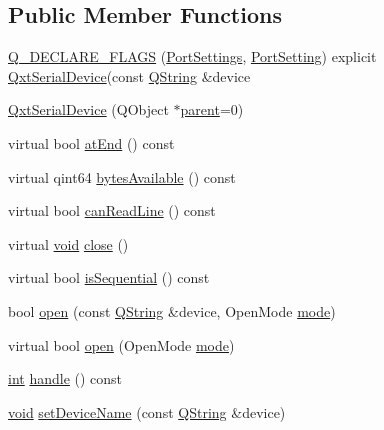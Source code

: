 \subsection*{Public Member Functions}
\begin{DoxyCompactItemize}
\item 
\hyperlink{class_qxt_serial_device_a98d6988c94e947f64b6294d244c6cdd2}{Q\-\_\-\-D\-E\-C\-L\-A\-R\-E\-\_\-\-F\-L\-A\-G\-S} (\hyperlink{struct_port_settings}{Port\-Settings}, \hyperlink{class_qxt_serial_device_aefe4c3cf41454d4595db50e03c4103da}{Port\-Setting}) explicit \hyperlink{class_qxt_serial_device}{Qxt\-Serial\-Device}(const \hyperlink{group___u_a_v_objects_plugin_gab9d252f49c333c94a72f97ce3105a32d}{Q\-String} \&device
\item 
\hyperlink{class_qxt_serial_device_adba1a3d0b96c4d390de8010239dcc214}{Qxt\-Serial\-Device} (Q\-Object $\ast$\hyperlink{class_qxt_serial_device_a0323aeafb6ee88ae1e3d2425972de5d1}{parent}=0)
\item 
virtual bool \hyperlink{class_qxt_serial_device_aae6e2093f74fb2771270fb48b090cdb2}{at\-End} () const 
\item 
virtual qint64 \hyperlink{class_qxt_serial_device_a15ceea004a7385796075a08d0f7d76b0}{bytes\-Available} () const 
\item 
virtual bool \hyperlink{class_qxt_serial_device_a0dc579e3c5b8890b9becfbc983241b57}{can\-Read\-Line} () const 
\item 
virtual \hyperlink{group___u_a_v_objects_plugin_ga444cf2ff3f0ecbe028adce838d373f5c}{void} \hyperlink{class_qxt_serial_device_a853d822d8c2877df6470d5da0a08195c}{close} ()
\item 
virtual bool \hyperlink{class_qxt_serial_device_a509bc0b97f4848619763dc778de3f4db}{is\-Sequential} () const 
\item 
bool \hyperlink{class_qxt_serial_device_a98bd4f4c9bc00c58547f800333207307}{open} (const \hyperlink{group___u_a_v_objects_plugin_gab9d252f49c333c94a72f97ce3105a32d}{Q\-String} \&device, Open\-Mode \hyperlink{glext_8h_a1e71d9c196e4683cc06c4b54d53f7ef5}{mode})
\item 
virtual bool \hyperlink{class_qxt_serial_device_aedb701102711e85f02efa128b30a3351}{open} (Open\-Mode \hyperlink{glext_8h_a1e71d9c196e4683cc06c4b54d53f7ef5}{mode})
\item 
\hyperlink{ioapi_8h_a787fa3cf048117ba7123753c1e74fcd6}{int} \hyperlink{class_qxt_serial_device_a0461530a5e229764224294237b94b6c1}{handle} () const 
\item 
\hyperlink{group___u_a_v_objects_plugin_ga444cf2ff3f0ecbe028adce838d373f5c}{void} \hyperlink{class_qxt_serial_device_ab3835ae3ec95dbb93290cf657275fd90}{set\-Device\-Name} (const \hyperlink{group___u_a_v_objects_plugin_gab9d252f49c333c94a72f97ce3105a32d}{Q\-String} \&device)

\end{DoxyCompactItemize}
